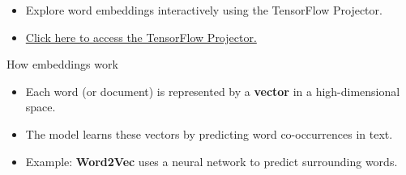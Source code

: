\documentclass[handout]{beamer}
\begin{document}

\begin{frame}{}

\begin{itemize}
    \item Explore word embeddings interactively using the TensorFlow Projector.
    \item \href{https://projector.tensorflow.org/}{Click here to access the TensorFlow Projector.}
\end{itemize}

\end{frame}


\begin{frame}{How embeddings work}
    \begin{itemize}
        \item Each word (or document) is represented by a \textbf{vector} in a high-dimensional space.
        \item The model learns these vectors by predicting word co-occurrences in text.
        \item Example: \textbf{Word2Vec} uses a neural network to predict surrounding words.
    \end{itemize}
\end{frame}
\end{document}
